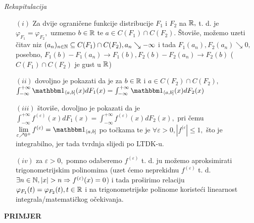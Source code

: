 \documentclass{article}
\begin{document}
\emph{Rekapitulacija}
\begin{enumerate}
    \item[\((i)\)]  Za dvije ograničene funkcije distribucije \(F_1\) i \(F_2\) na \(\Bbb R,\) t. d. je \(\varphi_{F_1}=\varphi_{F_2},\) uzmemo \(b\in\Bbb R\) te \(a\in C(F_1)\cap C(F_2).\) Štoviše, možemo uzeti čitav niz \((a_n)_{n\in\Bbb N}\subseteq C(F_1)\cap C(F_2),a_n\searrow-\infty\) i tada \(F_1(a_n),F_2(a_n)\searrow 0,\) posebno, \(F_1(b)-F_1(a_n)\to F_1(b),F_2(b)-F_2(a_n)\to F_2(b)\) (\(C(F_1)\cap C(F_2)\) je gust u \(\Bbb R\))
    \item[\((ii)\)] dovoljno je pokazati da je za \(b\in\Bbb R\) i \(a\in C(F_2)\cap C(F_2),\) \(\int_{-\infty}^{+\infty}\mathbbm 1_{\langle a,b]}(x)dF_1(x)=\int_{-\infty}^{+\infty}\mathbbm 1_{\langle a,b]}(x)dF_2(x)\)
    \item[\((iii)\)] štoviše, dovoljno je pokazati da je \(\int_{-\infty}^{+\infty}f^{(\varepsilon)}(x)dF_1(x)=\int_{-\infty}^{+\infty}f^{(\varepsilon)}(x)dF_2(x),\) pri čemu \(\lim\limits_{\varepsilon\nearrow 0^+}f^{(\varepsilon)}=\mathbbm 1_{\langle a,b]}\) po točkama te je \(\forall\varepsilon>0,|f^{(\varepsilon}|\le 1,\) što je integrabilno, jer tada tvrdnja slijedi po LTDK-u.
    \item[\((iv)\)] za \(\varepsilon>0,\) pomno odaberemo \(f^{(\varepsilon)}\) t. d. ju možemo aproksimirati trigonometrijskim polinomima (uzet ćemo neprekidnu \(f^{(\varepsilon)}\) t. d. \(\exists n\in\Bbb N,|x|>n\Rightarrow f^{(\varepsilon)}(x)=0\)) i tada proširimo relaciju \(\varphi_{F_1}(t)=\varphi_{F_2}(t),t\in\Bbb R\) i na trigonometrijske polinome koristeći linearnost integrala/matematičkog očekivanja.
\end{enumerate}
\textbf{PRIMJER}
\end{document}
